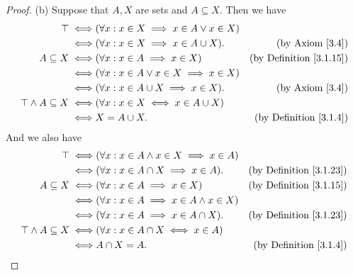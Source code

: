 \begin{proof}{(b)}
    Suppose that \(A, X\) are sets and \(A \subseteq X\).
    Then we have
    \begin{align*}
        \top \iff                     & (\forall x : x \in X \implies x \in A \lor x \in X)                                       \\
        \iff                          & (\forall x : x \in X \implies x \in A \cup X).      & \text{(by Axiom \ref{3.4})}         \\
        A \subseteq X \iff            & (\forall x : x \in A \implies x \in X)              & \text{(by Definition \ref{3.1.15})} \\
        \iff                          & (\forall x : x \in A \lor x \in X \implies x \in X)                                       \\
        \iff                          & (\forall x : x \in A \cup X \implies x \in X).      & \text{(by Axiom \ref{3.4})}         \\
        \top \land A \subseteq X \iff & (\forall x : x \in X \iff x \in A \cup X)                                                 \\
        \iff                          & X = A \cup X.                                       & \text{(by Definition \ref{3.1.4})}
    \end{align*}
    And we also have
    \begin{align*}
        \top \iff                     & (\forall x : x \in A \land x \in X \implies x \in A)                                       \\
        \iff                          & (\forall x : x \in A \cap X \implies x \in A).       & \text{(by Definition \ref{3.1.23})} \\
        A \subseteq X \iff            & (\forall x : x \in A \implies x \in X)               & \text{(by Definition \ref{3.1.15})} \\
        \iff                          & (\forall x : x \in A \implies x \in A \land x \in X)                                       \\
        \iff                          & (\forall x : x \in A \implies x \in A \cap X).       & \text{(by Definition \ref{3.1.23})} \\
        \top \land A \subseteq X \iff & (\forall x : x \in A \cap X \iff x \in A)                                                  \\
        \iff                          & A \cap X = A.                                        & \text{(by Definition \ref{3.1.4})}
    \end{align*}
\end{proof}

